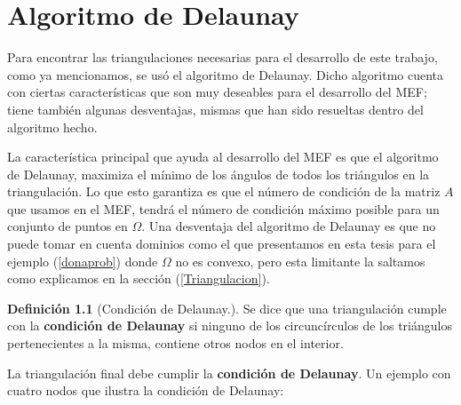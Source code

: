 \documentclass[12pt,spanish,oneside]{book}
\theoremstyle{plain}
\numberwithin{equation}{chapter}
\theoremstyle{definition}
\newtheorem{defi}{Definici\'{o}n}[chapter]
\theoremstyle{remark}
\begin{document}
\appendix
\chapter{Algoritmo de Delaunay}\label{DelaunayApendice}
Para encontrar las triangulaciones necesarias para el desarrollo de este trabajo, como ya mencionamos, se usó el algoritmo de Delaunay. Dicho algoritmo cuenta con ciertas características que son muy deseables para el desarrollo del MEF; tiene también algunas desventajas, mismas que han sido resueltas dentro del algoritmo hecho. 

La característica principal que ayuda al desarrollo del MEF es que el algoritmo de Delaunay, maximiza el mínimo de los ángulos de todos los triángulos en la triangulación. Lo que esto garantiza es que el número de condición de la matriz $A$ que usamos en el MEF, tendrá el número de condición máximo posible para un conjunto de puntos en $\Omega$. Una desventaja del algoritmo de Delaunay es que no puede tomar en cuenta dominios como el que presentamos en esta tesis para el ejemplo (\ref{donaprob}) donde $\Omega$ no es convexo, pero esta limitante la saltamos como explicamos en la sección (\ref{Triangulacion}). 
\begin{defi}[Condición de Delaunay.]
Se dice que una triangulación cumple con la \textbf{condición de Delaunay} si ninguno de los circuncírculos de los triángulos pertenecientes a la misma, contiene otros nodos en el interior. 
\end{defi}

La triangulación final debe cumplir la \textbf{condición de Delaunay}. Un ejemplo con cuatro nodos que ilustra la condición de Delaunay:
\end{document}
